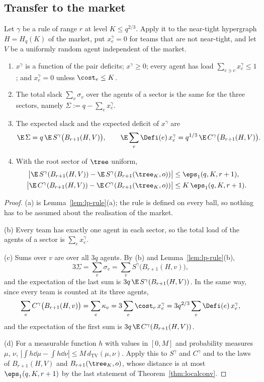 \subsection{Transfer to the market}\label{sec:lp-market}

\begin{lemma}\label{lem:lp-market}
Let $\gamma$ be a rule of range $r$ at level $K\le q^{2/3}$. Apply it to the near-tight
hypergraph $H=H_q(K)$ of the market, put $x^\gamma_e=0$ for teams that are not near-tight,
and let $V$ be a uniformly random agent independent of the market.
\begin{enumerate}
\item[\textup{(a)}] $x^\gamma$ is a function of the pair deficits; $x^\gamma\ge0$; every
agent has load $\sum_{e\ni v}x^\gamma_e\le1$; and $x^\gamma_e=0$ unless $\cost_e\le K$.
\item[\textup{(b)}] The total slack $\sum_v\sigma_v$ over the agents of a sector is the same
for the three sectors, namely $\Sigma:=q-\sum_ex^\gamma_e$.
\item[\textup{(c)}] The expected slack and the expected deficit of $x^\gamma$ are
\[
\E\,\Sigma=q\,\E\,S^\gamma\bigl(B_{r+1}(H,V)\bigr),\qquad
\E\sum_e\Defi(e)\,x^\gamma_e=q^{1/3}\,\E\,C^\gamma\bigl(B_{r+1}(H,V)\bigr).
\]
\item[\textup{(d)}] With the root sector of $\tree$ uniform,
\begin{align*}
\bigl|\E\,S^\gamma(B_{r+1}(H,V))-\E\,S^\gamma(B_{r+1}(\tree_K,o))\bigr|&\le\eps_1(q,K,r+1),\\
\bigl|\E\,C^\gamma(B_{r+1}(H,V))-\E\,C^\gamma(B_{r+1}(\tree_K,o))\bigr|&\le K\,\eps_1(q,K,r+1).
\end{align*}
\end{enumerate}
\end{lemma}

\begin{proof}
(a) is Lemma~\ref{lem:lp-rule}(a); the rule is defined on every ball, so nothing has to be
assumed about the realisation of the market.

(b) Every team has exactly one agent in each sector, so the total load of the agents of a
sector is $\sum_ex^\gamma_e$.

(c) Sums over $v$ are over all $3q$ agents. By (b) and Lemma~\ref{lem:lp-rule}(b),
\[
3\Sigma=\sum_v\sigma_v=\sum_vS^\gamma\bigl(B_{r+1}(H,v)\bigr),
\]
and the expectation of the last sum is $3q\,\E\,S^\gamma(B_{r+1}(H,V))$. In the same way,
since every team is counted at its three agents,
\[
\sum_vC^\gamma\bigl(B_{r+1}(H,v)\bigr)=\sum_v\kappa_v=3\sum_e\cost_e\,x^\gamma_e
=3q^{2/3}\sum_e\Defi(e)\,x^\gamma_e ,
\]
and the expectation of the first sum is $3q\,\E\,C^\gamma(B_{r+1}(H,V))$.

(d) For a measurable function $h$ with values in $[0,M]$ and probability measures $\mu$,
$\nu$, $|\int h\dd\mu-\int h\dd\nu|\le M\,d_{\mathrm{TV}}(\mu,\nu)$. Apply this to
$S^\gamma$ and $C^\gamma$ and to the laws of $B_{r+1}(H,V)$ and $B_{r+1}(\tree_K,o)$, whose
distance is at most $\eps_1(q,K,r+1)$ by the last statement of Theorem~\ref{thm:localconv}.
\end{proof}

